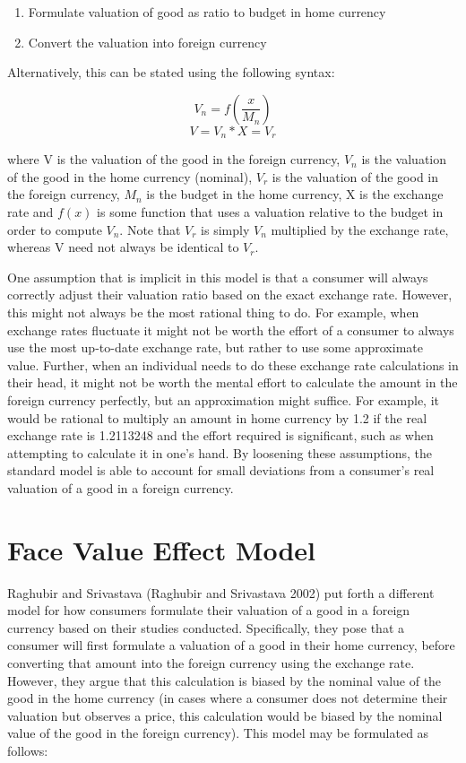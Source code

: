 \documentclass[
]{report}
\providecommand{\tightlist}{%
  \setlength{\itemsep}{0pt}\setlength{\parskip}{0pt}}\usepackage{longtable,booktabs,array}
\begin{document}
\begin{enumerate}
\def\labelenumi{\arabic{enumi}.}
\tightlist
\item
  Formulate valuation of good as ratio to budget in home currency
\item
  Convert the valuation into foreign currency
\end{enumerate}

Alternatively, this can be stated using the following syntax:

\[V_n = f(\dfrac{x}{M_n})\] \[V = V_n * X = V_r\]

where V is the valuation of the good in the foreign currency, \(V_n\) is
the valuation of the good in the home currency (nominal), \(V_r\) is the
valuation of the good in the foreign currency, \(M_n\) is the budget in
the home currency, X is the exchange rate and \(f(x)\) is some function
that uses a valuation relative to the budget in order to compute
\(V_n\). Note that \(V_r\) is simply \(V_n\) multiplied by the exchange
rate, whereas V need not always be identical to \(V_r\).

One assumption that is implicit in this model is that a consumer will
always correctly adjust their valuation ratio based on the exact
exchange rate. However, this might not always be the most rational thing
to do. For example, when exchange rates fluctuate it might not be worth
the effort of a consumer to always use the most up-to-date exchange
rate, but rather to use some approximate value. Further, when an
individual needs to do these exchange rate calculations in their head,
it might not be worth the mental effort to calculate the amount in the
foreign currency perfectly, but an approximation might suffice. For
example, it would be rational to multiply an amount in home currency by
1.2 if the real exchange rate is 1.2113248 and the effort required is
significant, such as when attempting to calculate it in one's hand. By
loosening these assumptions, the standard model is able to account for
small deviations from a consumer's real valuation of a good in a foreign
currency.

\section{Face Value Effect Model}\label{face-value-effect-model}

Raghubir and Srivastava (Raghubir and Srivastava 2002) put forth a
different model for how consumers formulate their valuation of a good in
a foreign currency based on their studies conducted. Specifically, they
pose that a consumer will first formulate a valuation of a good in their
home currency, before converting that amount into the foreign currency
using the exchange rate. However, they argue that this calculation is
biased by the nominal value of the good in the home currency (in cases
where a consumer does not determine their valuation but observes a
price, this calculation would be biased by the nominal value of the good
in the foreign currency). This model may be formulated as follows:
\end{document}
